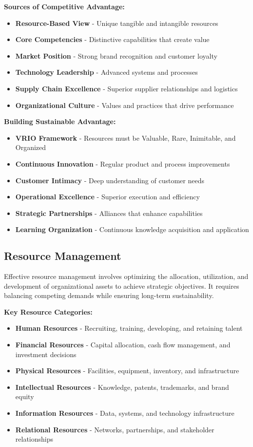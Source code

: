 \documentclass[12pt]{article}
\begin{document}
\textbf{Sources of Competitive Advantage:}
\begin{itemize}
    \item \textbf{Resource-Based View} - Unique tangible and intangible resources
    \item \textbf{Core Competencies} - Distinctive capabilities that create value
    \item \textbf{Market Position} - Strong brand recognition and customer loyalty
    \item \textbf{Technology Leadership} - Advanced systems and processes
    \item \textbf{Supply Chain Excellence} - Superior supplier relationships and logistics
    \item \textbf{Organizational Culture} - Values and practices that drive performance
\end{itemize}

\textbf{Building Sustainable Advantage:}
\begin{itemize}
    \item \textbf{VRIO Framework} - Resources must be Valuable, Rare, Inimitable, and Organized
    \item \textbf{Continuous Innovation} - Regular product and process improvements
    \item \textbf{Customer Intimacy} - Deep understanding of customer needs
    \item \textbf{Operational Excellence} - Superior execution and efficiency
    \item \textbf{Strategic Partnerships} - Alliances that enhance capabilities
    \item \textbf{Learning Organization} - Continuous knowledge acquisition and application
\end{itemize}

\subsection{Resource Management}
Effective resource management involves optimizing the allocation, utilization, and development of organizational assets to achieve strategic objectives. It requires balancing competing demands while ensuring long-term sustainability.

\textbf{Key Resource Categories:}
\begin{itemize}
    \item \textbf{Human Resources} - Recruiting, training, developing, and retaining talent
    \item \textbf{Financial Resources} - Capital allocation, cash flow management, and investment decisions
    \item \textbf{Physical Resources} - Facilities, equipment, inventory, and infrastructure
    \item \textbf{Intellectual Resources} - Knowledge, patents, trademarks, and brand equity
    \item \textbf{Information Resources} - Data, systems, and technology infrastructure
    \item \textbf{Relational Resources} - Networks, partnerships, and stakeholder relationships
\end{itemize}
\end{document}
